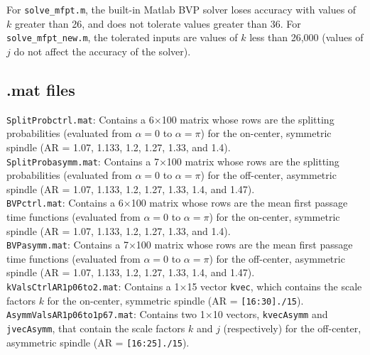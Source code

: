 \documentclass{article}
\begin{document}
\noindent For \texttt{solve\_mfpt.m}, the built-in Matlab BVP solver loses accuracy with values of $k$ greater than 26, and does not tolerate values greater than 36. For \texttt{solve\_mfpt\_new.m}, the tolerated inputs are values of $k$ less than 26,000 (values of $j$ do not affect the accuracy of the solver).

\subsection{.mat files}
\noindent\texttt{SplitProbctrl.mat}: Contains a 6$\times$100 matrix whose rows are the splitting probabilities (evaluated from $\alpha = 0$ to $\alpha = \pi$) for the on-center, symmetric spindle (AR = 1.07, 1.133, 1.2, 1.27, 1.33, and 1.4). \\[3pt]

\noindent\texttt{SplitProbasymm.mat}: Contains a 7$\times$100 matrix whose rows are the splitting probabilities (evaluated from $\alpha = 0$ to $\alpha = \pi$) for the off-center, asymmetric spindle (AR = 1.07, 1.133, 1.2, 1.27, 1.33, 1.4, and 1.47).
\\[3pt]

\noindent\texttt{BVPctrl.mat}: Contains a 6$\times$100 matrix whose rows are the mean first passage time functions (evaluated from $\alpha = 0$ to $\alpha = \pi$) for the on-center, symmetric spindle (AR = 1.07, 1.133, 1.2, 1.27, 1.33, and 1.4). \\[3pt]

\noindent\texttt{BVPasymm.mat}: Contains a 7$\times$100 matrix whose rows are the mean first passage time functions (evaluated from $\alpha = 0$ to $\alpha = \pi$) for the off-center, asymmetric spindle (AR = 1.07, 1.133, 1.2, 1.27, 1.33, 1.4, and 1.47).
\\[3pt]

\noindent\texttt{kValsCtrlAR1p06to2.mat}: Contains a 1$\times$15 vector \texttt{kvec}, which contains the scale factors $k$ for the on-center, symmetric spindle (AR = \texttt{[16:30]./15}).
\\[3pt]

\noindent\texttt{AsymmValsAR1p06to1p67.mat}: Contains two 1$\times$10 vectors, \texttt{kvecAsymm} and \texttt{jvecAsymm}, that contain the scale factors $k$ and $j$ (respectively) for the off-center, asymmetric spindle (AR = \texttt{[16:25]./15}).
\end{document}
